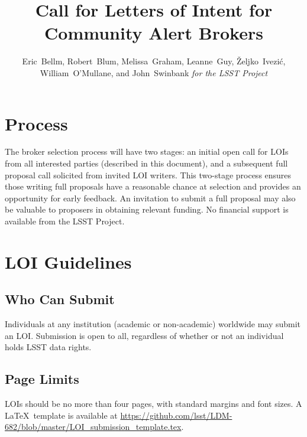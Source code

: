 \documentclass[DM,toc]{lsstdoc}
\title{Call for Letters of Intent for Community Alert Brokers}
\author{
Eric~Bellm,
Robert~Blum,
Melissa~Graham,
Leanne~Guy,
\v{Z}eljko~Ivezi\'{c},
William~O'Mullane,
and John~Swinbank
\emph{for the LSST Project}
}
\begin{document}

\maketitle

\section{Process}

The broker selection process will have two stages:
an initial open call for LOIs from all interested parties (described in this document), and a subsequent full proposal call solicited from invited LOI writers.
This two-stage process ensures those writing full proposals have a reasonable chance at selection and provides an opportunity for early feedback.
An invitation to submit a full proposal may also be valuable to proposers in obtaining relevant funding.
No financial support is available from the LSST Project.


\section{LOI Guidelines}

\subsection{Who Can Submit}

Individuals at any institution (academic or non-academic) worldwide may submit an LOI.
Submission is open to all, regardless of whether or not an individual holds LSST data rights.


\subsection{Page Limits}

LOIs should be no more than four pages, with standard margins and font sizes.
A \LaTeX\ template is available at \url{https://github.com/lsst/LDM-682/blob/master/LOI_submission_template.tex}.
\end{document}
